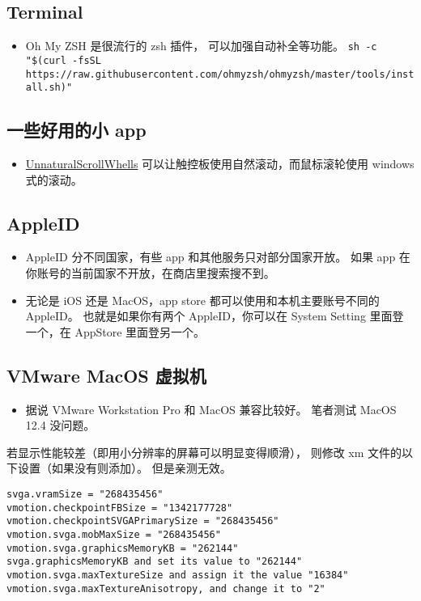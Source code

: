\subsection{Terminal}
\begin{itemize}
\item Oh My ZSH 是很流行的 zsh 插件， 可以加强自动补全等功能。 \verb`sh -c "$(curl -fsSL https://raw.githubusercontent.com/ohmyzsh/ohmyzsh/master/tools/install.sh)"`
\end{itemize}

\subsection{一些好用的小 app}
\begin{itemize}
\item \href{https://github.com/ther0n/UnnaturalScrollWheels}{UnnaturalScrollWhells} 可以让触控板使用自然滚动，而鼠标滚轮使用 windows 式的滚动。
\end{itemize}

\subsection{AppleID}
\begin{itemize}
\item AppleID 分不同国家，有些 app 和其他服务只对部分国家开放。 如果 app 在你账号的当前国家不开放，在商店里搜索搜不到。
\item 无论是 iOS 还是 MacOS，app store 都可以使用和本机主要账号不同的 AppleID。 也就是如果你有两个 AppleID，你可以在 System Setting 里面登一个，在 AppStore 里面登另一个。
\end{itemize}

\subsection{VMware MacOS 虚拟机}
\begin{itemize}
\item 据说 VMware Workstation Pro 和 MacOS 兼容比较好。 笔者测试 MacOS 12.4 没问题。
\end{itemize}

若显示性能较差（即用小分辨率的屏幕可以明显变得顺滑）， 则修改 xm 文件的以下设置（如果没有则添加）。 但是亲测无效。
\begin{lstlisting}[language=none]
svga.vramSize = "268435456"
vmotion.checkpointFBSize = "1342177728"
vmotion.checkpointSVGAPrimarySize = "268435456"
vmotion.svga.mobMaxSize = "268435456"
vmotion.svga.graphicsMemoryKB = "262144"
svga.graphicsMemoryKB and set its value to "262144"
vmotion.svga.maxTextureSize and assign it the value "16384"
vmotion.svga.maxTextureAnisotropy, and change it to "2"
\end{lstlisting}

